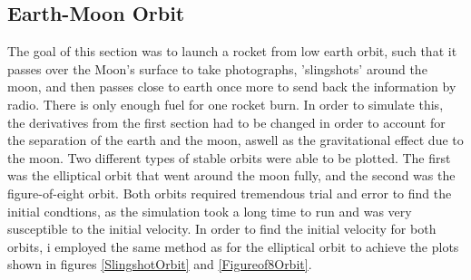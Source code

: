 \documentclass[twocolumn, prl, nobalancelastpage, aps, citeautoscript, longbibliography, 10pt]{revtex4-1}
\begin{document}
\subsection{Earth-Moon Orbit}
The goal of this section was to launch a rocket from low earth orbit, such that it passes over the Moon's surface to take photographs, 'slingshots'
around the moon, and then passes close to earth once more to send back the information by radio. There is only enough fuel for one rocket burn.
In order to simulate this, the derivatives from the first section had to be changed in order to account for the separation of the earth and the moon,
aswell as the gravitational effect due to the moon. Two different types of stable orbits were able to be plotted. The first was the elliptical orbit that 
went around the moon fully, and the second was the figure-of-eight orbit. Both orbits required tremendous trial and error to find 
the initial condtions, as the simulation took a long time to run and was very susceptible to the initial velocity. In order to find the initial velocity 
for both orbits, i employed the same method as for the elliptical orbit to achieve the plots shown in figures \ref{SlingshotOrbit} and \ref{Figureof8Orbit}.
\end{document}
